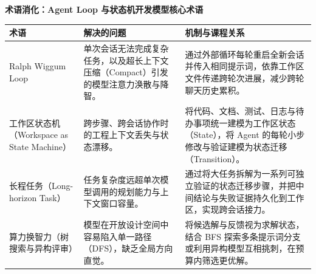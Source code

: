 \documentclass[UTF8,a4paper,11pt,fontset=fandol]{ctexart}
\begin{document}
\par{}\textbf{术语消化：Agent Loop 与状态机开发模型核心术语}

\begin{center}\small\begin{tabularx}{\linewidth}{YYY}

\toprule

术语 & 解决的问题 & 机制与课程关系\\\midrule

Ralph Wiggum Loop & 单次会话无法完成复杂任务，以及超长上下文压缩（Compact）引发的模型注意力涣散与降智。 & 通过外部循环每轮重启全新会话并传入相同提示词，依靠工作区文件传递跨轮次进展，减少跨轮聊天历史累积。\\[3pt]

工作区状态机（Workspace as State Machine） & 跨步骤、跨会话协作时的工程上下文丢失与状态漂移。 & 将代码、文档、测试、日志与待办事项统一建模为工作区状态（State），将 Agent 的每轮小步修改与验证建模为状态迁移（Transition）。\\[3pt]

长程任务（Long-horizon Task） & 任务复杂度远超单次模型调用的规划能力与上下文窗口容量。 & 通过将大任务拆解为一系列可独立验证的状态迁移步骤，并把中间结论与失败证据持久化到工作区，实现跨会话接力。\\[3pt]

算力换智力（树搜索与异构评审） & 模型在开放设计空间中容易陷入单一路径（DFS），缺乏全局方向直觉。 & 将候选解与反馈视为求解状态，结合 BFS 探索多条提示词分支或利用异构模型互相挑刺，在预算内筛选更优解。\\[3pt]

\bottomrule\end{tabularx}\end{center}
\end{document}
